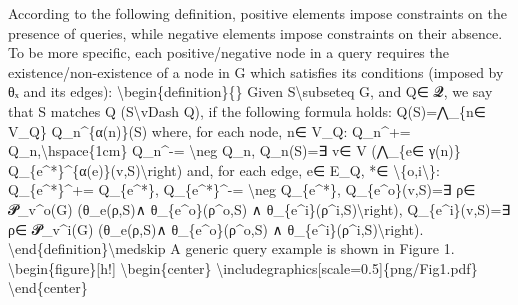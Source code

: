 \documentclass{article}%
\begin{document}
\newline%
According to the following definition, positive elements impose constraints on the presence of queries, while negative elements impose constraints on their absence. To be more specific, each positive/negative node in a query requires the existence/non{-}existence of a node in G which satisfies its conditions (imposed by θₓ and its edges):\newline%
\newline%
\textbackslash{}begin\{definition\}\{\}\newline%
Given S\textbackslash{}subseteq G, and Q∈ 𝓠, we say that S matches Q (S\textbackslash{}vDash Q), if the following formula holds:\newline%
\newline%
Q(S)=⋀\_\{n∈ V\_Q\} Q\_n\^{}\{α(n)\}(S)\newline%
where, for each node, n∈ V\_Q:\newline%
Q\_n\^{}+= Q\_n,\textbackslash{}hspace\{1cm\} Q\_n\^{}{-}= \textbackslash{}neg Q\_n,\newline%
Q\_n(S)=∃ v∈ V (⋀\_\{e∈ γ(n)\} Q\_\{e\^{}*\}\^{}\{α(e)\}(v,S)\textbackslash{}right)\newline%
and, for each edge, e∈ E\_Q, *∈ \textbackslash{}\{o,i\textbackslash{}\}:\newline%
Q\_\{e\^{}*\}\^{}+= Q\_\{e\^{}*\}, Q\_\{e\^{}*\}\^{}{-}= \textbackslash{}neg Q\_\{e\^{}*\},\newline%
\newline%
Q\_\{e\^{}o\}(v,S)=∃ ρ∈ 𝓟\_v\^{}o(G) (θ\_e(ρ,S)∧ θ\_\{e\^{}o\}(ρ\^{}o,S) ∧ θ\_\{e\^{}i\}(ρ\^{}i,S)\textbackslash{}right),\newline%
Q\_\{e\^{}i\}(v,S)=∃ ρ∈ 𝓟\_v\^{}i(G) (θ\_e(ρ,S)∧ θ\_\{e\^{}o\}(ρ\^{}o,S) ∧ θ\_\{e\^{}i\}(ρ\^{}i,S)\textbackslash{}right).\newline%
\newline%
\textbackslash{}end\{definition\}\textbackslash{}medskip\newline%
\newline%
A generic query example is shown in Figure 1.\newline%
\newline%
\textbackslash{}begin\{figure\}{[}h!{]}\newline%
\textbackslash{}begin\{center\}\newline%
\textbackslash{}includegraphics{[}scale=0.5{]}\{png/Fig1.pdf\}\newline%
\textbackslash{}end\{center\}\newline%
\end{document}
